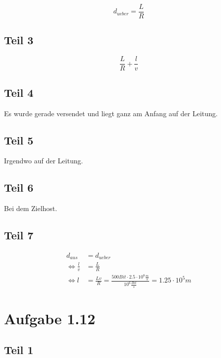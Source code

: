 \documentclass[10pt,a4paper]{article}
\begin{document}
\begin{equation}
  d_{ueber} = \frac{L}{R}
\end{equation}

\subsection{Teil 3}

\begin{equation}
  \frac{L}{R} + \frac{l}{v}
\end{equation}

\subsection{Teil 4}

Es wurde gerade versendet und liegt ganz am Anfang auf der Leitung.

\subsection{Teil 5}

Irgendwo auf der Leitung.

\subsection{Teil 6}

Bei dem Zielhost.

\subsection{Teil 7}

\begin{align*}
  d_{aus} & = d_{ueber}\\
  \Leftrightarrow \frac{l}{v} & = \frac{L}{R}\\
  \Leftrightarrow l & = \frac{Lv}{R} = \frac{500 Bit \cdot 2.5 \cdot 10^{8} \frac{m}{s}}{10^{6} \frac{Bit}{s}} = 1.25 \cdot 10^{5}m
\end{align*}

\section{Aufgabe 1.12}

\subsection{Teil 1}
\end{document}

